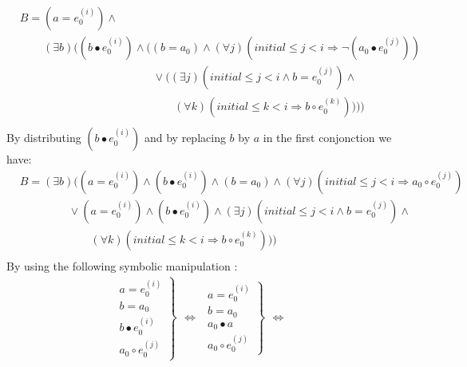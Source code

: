 \documentclass[a4paper,10pt]{article}
\newcommand{\idx}{\ensuremath{i}\xspace}
\newcommand{\idxinitial}{\ensuremath{\mathit{initial}}\xspace}
\newcommand{\at}[1]{{(#1)}}
\newcommand{\impl}{\ensuremath{\Longrightarrow}}
\newenvironment{proof}[1][Proof.]{\begin{trivlist}
\item[\hskip \labelsep {\bfseries #1}]}{\end{trivlist}}
\begin{document}
\begin{proof}
\begin{align*}
    &B= (a = e_0^\at{\idx}) \land \\
    &\phantom{B=} 
       (\exists b) ((b \bullet e_0^\at{\idx}) \land ((b = a_0) \land 
       (\forall j)(\idxinitial \leq j < \idx \impl \neg (a_0 \bullet e_0^\at{j})) \\
    &\phantom{B= (a = e_0^\at{\idx}) \land (\exists b) (} 
       \lor ((\exists j)(\idxinitial \leq j < \idx \land b = e_0^\at{j}) \land \\
    &\phantom{B= (a = e_0^\at{\idx}) \land ((b \bullet e_0\at{\idx}} 
       (\forall k)(\idxinitial \leq k < \idx \impl b \circ e_0^\at{k})))) \\
  \end{align*}
  By distributing $(b \bullet e_0^\at{\idx})$ and by replacing $b$ by $a$ in the first conjonction we have:
  \begin{align*}
    &B=(\exists b) ((a = e_0^\at{\idx}) \land (b \bullet e_0^\at{\idx}) \land 
       (b = a_0) \land (\forall j)(\idxinitial \leq j < \idx \impl a_0 \circ e_0^\at{j}) \\
    &\phantom{B= (a =} 
       \lor (a = e_0^\at{\idx}) \land  (b \bullet e_0^\at{\idx}) \land 
       (\exists j)(\idxinitial \leq j < \idx \land b = e_0^\at{j}) \land \\
    &\phantom{B= (a = e_0^\at{\idx}} 
       (\forall k)(\idxinitial \leq k < \idx \impl b \circ e_0^\at{k}))) \\
  \end{align*}
  By using the following symbolic manipulation :
  $$\begin{array}{cl}
    \left.\begin{aligned}
      a = e_0^\at{\idx}\\
      b = a_0\\
      b \bullet e_0^\at{\idx}\\
      a_0 \circ e_0^\at{j}
    \end{aligned} \right\}
  \end{array} 
  \Leftrightarrow
  \begin{array}{cl}
    \left.\begin{aligned}
      a = e_0^\at{\idx}\\
      b = a_0\\
      a_0 \bullet a\\
      a_0 \circ e_0^\at{j}
    \end{aligned} \right\}
   \end{array}
  \Leftrightarrow
  \begin{array}{cl}
    \left.\begin{aligned}

\end{aligned}
\end{array}$$
\end{proof}
\end{document}
